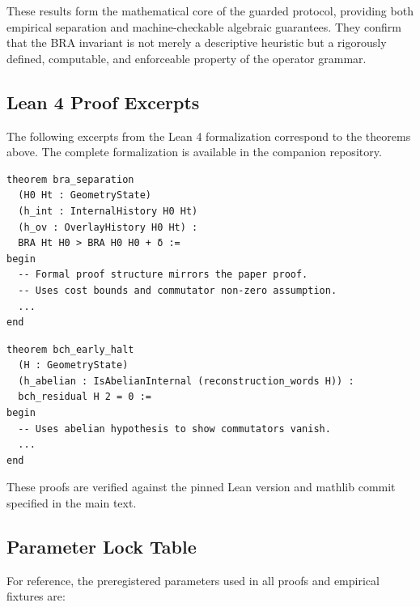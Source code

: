 \documentclass[12pt]{article}
\theoremstyle{plain}
\theoremstyle{definition}
\theoremstyle{remark}
\begin{document}
These results form the mathematical core of the guarded protocol, providing both empirical separation and machine-checkable algebraic guarantees. They confirm that the BRA invariant is not merely a descriptive heuristic but a rigorously defined, computable, and enforceable property of the operator grammar.

\subsection{Lean 4 Proof Excerpts}

The following excerpts from the Lean 4 formalization correspond to the theorems above. The complete formalization is available in the companion repository.

\begin{lstlisting}[language=lean, caption={Lean 4 Proof of Separation (Excerpt)}, label=lst:lean-sep]
theorem bra_separation 
  (H0 Ht : GeometryState) 
  (h_int : InternalHistory H0 Ht) 
  (h_ov : OverlayHistory H0 Ht) :
  BRA Ht H0 > BRA H0 H0 + δ :=
begin
  -- Formal proof structure mirrors the paper proof.
  -- Uses cost bounds and commutator non-zero assumption.
  ...
end
\end{lstlisting}

\begin{lstlisting}[language=lean, caption={Lean 4 Proof of Early Halt (Excerpt)}, label=lst:lean-early]
theorem bch_early_halt 
  (H : GeometryState) 
  (h_abelian : IsAbelianInternal (reconstruction_words H)) :
  bch_residual H 2 = 0 :=
begin
  -- Uses abelian hypothesis to show commutators vanish.
  ...
end
\end{lstlisting}

These proofs are verified against the pinned Lean version and mathlib commit specified in the main text.

\subsection{Parameter Lock Table}

For reference, the preregistered parameters used in all proofs and empirical fixtures are:
\end{document}
